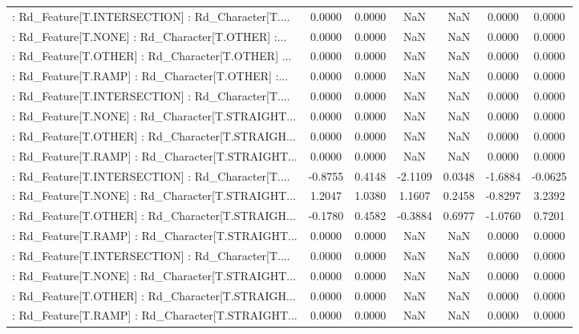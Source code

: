 \begin{longtable}{p{4cm}cccccc}
 : Rd\_Feature[T.INTERSECTION] : Rd\_Character[T.... &  0.0000 &    0.0000 &     NaN &          NaN &  0.0000 &  0.0000 \\
 : Rd\_Feature[T.NONE] : Rd\_Character[T.OTHER] :... &  0.0000 &    0.0000 &     NaN &          NaN &  0.0000 &  0.0000 \\
 : Rd\_Feature[T.OTHER] : Rd\_Character[T.OTHER] ... &  0.0000 &    0.0000 &     NaN &          NaN &  0.0000 &  0.0000 \\
 : Rd\_Feature[T.RAMP] : Rd\_Character[T.OTHER] :... &  0.0000 &    0.0000 &     NaN &          NaN &  0.0000 &  0.0000 \\
 : Rd\_Feature[T.INTERSECTION] : Rd\_Character[T.... &  0.0000 &    0.0000 &     NaN &          NaN &  0.0000 &  0.0000 \\
 : Rd\_Feature[T.NONE] : Rd\_Character[T.STRAIGHT... &  0.0000 &    0.0000 &     NaN &          NaN &  0.0000 &  0.0000 \\
 : Rd\_Feature[T.OTHER] : Rd\_Character[T.STRAIGH... &  0.0000 &    0.0000 &     NaN &          NaN &  0.0000 &  0.0000 \\
 : Rd\_Feature[T.RAMP] : Rd\_Character[T.STRAIGHT... &  0.0000 &    0.0000 &     NaN &          NaN &  0.0000 &  0.0000 \\
 : Rd\_Feature[T.INTERSECTION] : Rd\_Character[T.... & -0.8755 &    0.4148 & -2.1109 &       0.0348 & -1.6884 & -0.0625 \\
 : Rd\_Feature[T.NONE] : Rd\_Character[T.STRAIGHT... &  1.2047 &    1.0380 &  1.1607 &       0.2458 & -0.8297 &  3.2392 \\
 : Rd\_Feature[T.OTHER] : Rd\_Character[T.STRAIGH... & -0.1780 &    0.4582 & -0.3884 &       0.6977 & -1.0760 &  0.7201 \\
 : Rd\_Feature[T.RAMP] : Rd\_Character[T.STRAIGHT... &  0.0000 &    0.0000 &     NaN &          NaN &  0.0000 &  0.0000 \\
 : Rd\_Feature[T.INTERSECTION] : Rd\_Character[T.... &  0.0000 &    0.0000 &     NaN &          NaN &  0.0000 &  0.0000 \\
 : Rd\_Feature[T.NONE] : Rd\_Character[T.STRAIGHT... &  0.0000 &    0.0000 &     NaN &          NaN &  0.0000 &  0.0000 \\
 : Rd\_Feature[T.OTHER] : Rd\_Character[T.STRAIGH... &  0.0000 &    0.0000 &     NaN &          NaN &  0.0000 &  0.0000 \\
 : Rd\_Feature[T.RAMP] : Rd\_Character[T.STRAIGHT... &  0.0000 &    0.0000 &     NaN &          NaN &  0.0000 &  0.0000 \\

\end{longtable}
